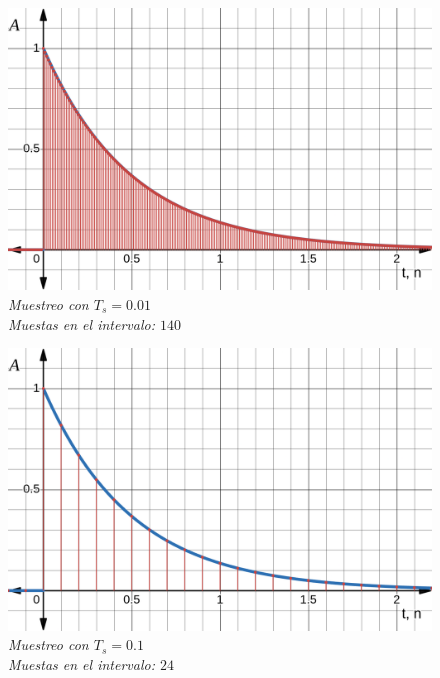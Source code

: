 \documentclass[a4paper,12pt]{report}
\begin{document}
\begin{enumerate}[label=\alph*), left=0pt]
    \begin{figure}[H]
      \centering
      \begin{minipage}{0.55\textwidth}
        \centering
        \includegraphics[width=1\textwidth]{./images/ej1.2.png}
        \textit{Muestreo con $T_s=0.01$\\Muestas en el intervalo: $140$}
      \end{minipage}
    \end{figure}

    \begin{figure}[H]
      \centering
      \begin{minipage}{0.55\textwidth}
        \centering
        \includegraphics[width=1\textwidth]{./images/ej1.3.png}
        \textit{Muestreo con $T_s=0.1$\\Muestas en el intervalo: $24$}
      \end{minipage}
    \end{figure}



\end{enumerate}
\end{document}
